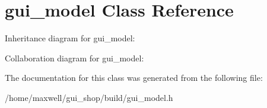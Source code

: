 \hypertarget{classgui__model}{}\section{gui\+\_\+model Class Reference}
\label{classgui__model}


Inheritance diagram for gui\+\_\+model\+:


Collaboration diagram for gui\+\_\+model\+:


The documentation for this class was generated from the following file\+:\begin{DoxyCompactItemize}
\item 
/home/maxwell/gui\+\_\+shop/build/gui\+\_\+model.\+h\end{DoxyCompactItemize}
